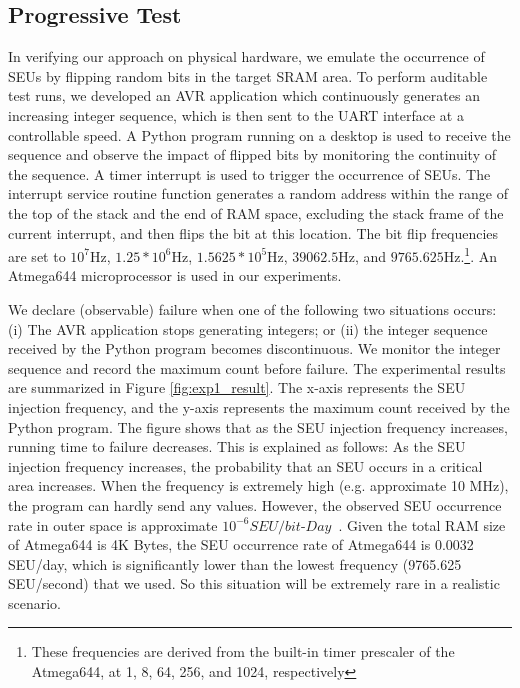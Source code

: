\subsection{Progressive Test}
In verifying our approach on physical hardware, we emulate the occurrence of SEUs by flipping random bits in the target SRAM area. To perform auditable test runs, we developed an AVR application which continuously generates an increasing integer sequence, which is then sent to the UART interface at a controllable speed. A Python program running on a desktop is used to receive the sequence and observe the impact of flipped bits by monitoring the continuity of the sequence. A timer interrupt is used to trigger the occurrence of SEUs. The interrupt service routine function generates a random address within the range of the top of the stack and the end of RAM space, excluding the stack frame of the current interrupt, and then flips the bit at this location. The bit flip frequencies are set to $10^7$Hz, $1.25*10^6$Hz, $1.5625*10^5$Hz, $39062.5$Hz, and $9765.625$Hz.\footnote{These frequencies are derived from the built-in timer prescaler of the Atmega644, at 1, 8, 64, 256, and 1024, respectively}. An Atmega644 microprocessor is used in our experiments.

We declare (observable) failure when one of the following two situations occurs: (i) The AVR application stops generating integers; or (ii) the integer sequence received by the Python program becomes discontinuous. We monitor the integer sequence and record the maximum count before failure. The experimental results are summarized in Figure \ref{fig:exp1_result}. The x-axis represents the SEU injection frequency, and the y-axis represents the maximum count received by the Python program. The figure shows that as the SEU injection frequency increases, running time to failure decreases. This is explained as follows: As the SEU injection frequency increases, the probability that an SEU occurs in a critical area increases. When the frequency is extremely high (e.g. approximate 10 MHz), the program can hardly send any values. However, the observed SEU occurrence rate in outer space is approximate $10^{-6}SEU/bit$-$Day$~\cite{underwood1992observations}. Given the total RAM size of Atmega644 is 4K Bytes, the SEU occurrence rate of Atmega644 is 0.0032 SEU/day, which is significantly lower than the lowest frequency (9765.625 SEU/second) that we used. So this situation will be extremely rare in a realistic scenario.

